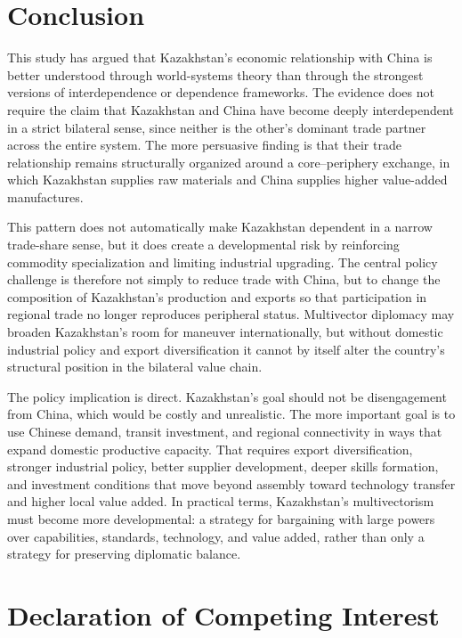 \documentclass[12pt]{article}
\begin{document}
\section{Conclusion}

This study has argued that Kazakhstan's economic relationship with China is better understood through world-systems theory than through the strongest versions of interdependence or dependence frameworks. The evidence does not require the claim that Kazakhstan and China have become deeply interdependent in a strict bilateral sense, since neither is the other's dominant trade partner across the entire system. The more persuasive finding is that their trade relationship remains structurally organized around a core--periphery exchange, in which Kazakhstan supplies raw materials and China supplies higher value-added manufactures.

This pattern does not automatically make Kazakhstan dependent in a narrow trade-share sense, but it does create a developmental risk by reinforcing commodity specialization and limiting industrial upgrading. The central policy challenge is therefore not simply to reduce trade with China, but to change the composition of Kazakhstan's production and exports so that participation in regional trade no longer reproduces peripheral status. Multivector diplomacy may broaden Kazakhstan's room for maneuver internationally, but without domestic industrial policy and export diversification it cannot by itself alter the country's structural position in the bilateral value chain.

The policy implication is direct. Kazakhstan's goal should not be disengagement from China, which would be costly and unrealistic. The more important goal is to use Chinese demand, transit investment, and regional connectivity in ways that expand domestic productive capacity. That requires export diversification, stronger industrial policy, better supplier development, deeper skills formation, and investment conditions that move beyond assembly toward technology transfer and higher local value added. In practical terms, Kazakhstan's multivectorism must become more developmental: a strategy for bargaining with large powers over capabilities, standards, technology, and value added, rather than only a strategy for preserving diplomatic balance.

\section*{Declaration of Competing Interest}
\end{document}
